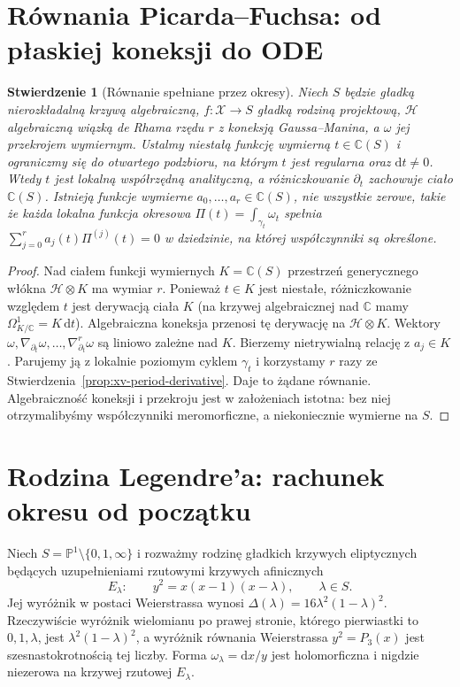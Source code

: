 \documentclass[11pt,a4paper,oneside]{report}
\newcommand{\C}{\mathbb{C}}
\newcommand{\dd}{\mathrm d}
\theoremstyle{plain}
\newtheorem{stwierdzenie}[twierdzenie]{Stwierdzenie}
\theoremstyle{definition}
\theoremstyle{remark}
\begin{document}
\section{Równania Picarda--Fuchsa: od płaskiej koneksji do ODE}
\begin{stwierdzenie}[Równanie spełniane przez okresy]
\label{prop:xv-pf-general}
Niech $S$ będzie gładką nierozkładalną krzywą algebraiczną,
$f:\mathcal X\to S$ gładką rodziną projektową,
$\mathcal H$ algebraiczną wiązką de Rhama rzędu $r$
z koneksją Gaussa--Manina, a $\omega$ jej przekrojem
wymiernym. Ustalmy niestałą funkcję wymierną $t\in\C(S)$
i ograniczmy się do otwartego podzbioru, na którym $t$
jest regularna oraz $\dd t\neq0$. Wtedy $t$ jest
lokalną współrzędną analityczną, a różniczkowanie
$\partial_t$ zachowuje ciało $\C(S)$. Istnieją
funkcje wymierne $a_0,\dots,a_r\in\C(S)$, nie wszystkie zerowe,
takie że każda lokalna funkcja okresowa
$\Pi(t)=\int_{\gamma_t}\omega_t$ spełnia
$\sum_{j=0}^ra_j(t)\Pi^{(j)}(t)=0$
w dziedzinie, na której współczynniki są określone.
\end{stwierdzenie}
\begin{proof}
Nad ciałem funkcji wymiernych $K=\C(S)$ przestrzeń
generycznego włókna $\mathcal H\otimes K$ ma wymiar $r$.
Ponieważ $t\in K$ jest niestałe, różniczkowanie względem
$t$ jest derywacją ciała $K$ (na krzywej algebraicznej nad
$\C$ mamy $\Omega^1_{K/\C}=K\,\dd t$).
Algebraiczna koneksja przenosi tę derywację na $\mathcal H\otimes K$.
Wektory $\omega,\nabla_{\partial_t}\omega,\dots,
\nabla_{\partial_t}^{r}\omega$ są liniowo zależne nad $K$.
Bierzemy nietrywialną relację z $a_j\in K$.
Parujemy ją z lokalnie poziomym cyklem $\gamma_t$ i
korzystamy $r$ razy ze
Stwierdzenia~\ref{prop:xv-period-derivative}.
Daje to żądane równanie. Algebraiczność koneksji
i przekroju jest w założeniach istotna:
bez niej otrzymalibyśmy współczynniki meromorficzne,
a niekoniecznie wymierne na $S$.
\end{proof}

\section{Rodzina Legendre'a: rachunek okresu od początku}
\label{sec:xv-legendre}
Niech $S=\mathbb P^1\setminus\{0,1,\infty\}$ i rozważmy
rodzinę gładkich krzywych eliptycznych będących
uzupełnieniami rzutowymi krzywych afinicznych
\[
E_\lambda:\qquad y^2=x(x-1)(x-\lambda),\qquad \lambda\in S.
\]
Jej wyróżnik w postaci Weierstrassa wynosi
$\Delta(\lambda)=16\lambda^2(1-\lambda)^2$.
Rzeczywiście wyróżnik wielomianu po prawej stronie,
którego pierwiastki to $0,1,\lambda$, jest
$\lambda^2(1-\lambda)^2$, a wyróżnik równania
Weierstrassa $y^2=P_3(x)$ jest szesnastokrotnością tej liczby.
Forma $\omega_\lambda=\dd x/y$ jest holomorficzna i
nigdzie niezerowa na krzywej rzutowej $E_\lambda$.
\end{document}
